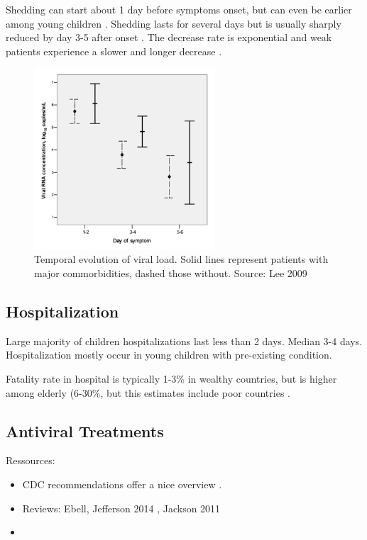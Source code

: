 \documentclass[11pt, onecolumn]{article}
\begin{document}
Shedding can start about 1 day before symptoms onset, but can even be earlier among young children \cite{CDC:2011wq}. Shedding lasts for several days but is usually sharply reduced by day 3-5 after onset \cite{CDC:2011wq}. The decrease rate is exponential and weak patients experience a slower and longer decrease \cite{Lee:2009dc}.

\begin{figure}[!ht]
\centering
    \includegraphics[angle=0,width=0.6\textwidth]{figures/VL_Lee.png}
\caption{Temporal evolution of viral load. Solid lines represent patients with major commorbidities, dashed those without. Source: Lee 2009 \cite{Lee:2009dc}}
\label{fig:VL_Lee}
\end{figure}


\subsection{Hospitalization}

Large majority of children hospitalizations last less than 2 days. Median 3-4 days. Hospitalization mostly occur in young children with pre-existing condition.

Fatality rate in hospital is typically 1-3\% in wealthy countries, but is higher among elderly (6-30\%, but this estimates include poor countries \cite{Wong:2015bb}.



\subsection{Antiviral Treatments}

Ressources:
\begin{itemize}
\item  CDC recommendations offer a nice overview \cite{CDC:2011wq}.
\item Reviews: Ebell\cite{Ebell:2014ic},  Jefferson 2014 \cite{Jefferson:2014ei}, Jackson 2011 \cite{Jackson:2011ff}
\item 
\end{itemize}
\end{document}
